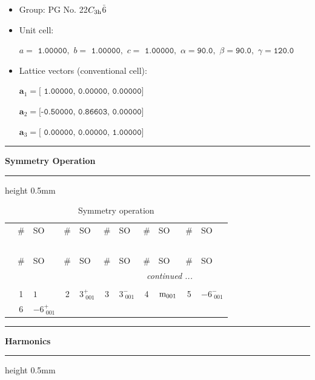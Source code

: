 \documentclass[fleqn,10pt,landscape]{jsarticle}
\begin{document}
\begin{itemize}
\item Group: PG No. 22\quad$C_{\rm 3h}$\quad$\bar{6}$\quad[ hexagonal ]
\end{itemize}
\begin{itemize}
\item Unit cell:

\quad $a=\texttt{ 1.00000},\,\, b=\texttt{ 1.00000},\,\, c=\texttt{ 1.00000},\,\, \alpha=\texttt{90.0},\,\, \beta=\texttt{90.0},\,\, \gamma=\texttt{120.0}$

\item Lattice vectors (conventional cell):

\quad $\bm{a}_1=\texttt{[ 1.00000, 0.00000, 0.00000]}$

\quad $\bm{a}_2=\texttt{[-0.50000, 0.86603, 0.00000]}$

\quad $\bm{a}_3=\texttt{[ 0.00000, 0.00000, 1.00000]}$

\end{itemize}
\vspace{5mm}
\noindent \rule[0.5mm]{5mm}{0.5mm}\hspace{3mm}\textbf{Symmetry Operation}\hspace{3mm}\leaders\hrule height 0.5mm\hfill\kern0pt
\vspace{3mm}

\renewcommand{\arraystretch}{1.6}
\begin{longtable}[l]{c|cl|cl|cl|cl|cl}
\captionsetup{justification=raggedright, singlelinecheck=off}
\caption{Symmetry operation}
 \\
 \hline \hline
 & \# & SO & \# & SO & \# & SO & \# & SO & \# & SO \\ \hline \endfirsthead

\multicolumn{10}{l}{\tablename\ \thetable{}} \\
 \hline \hline
 & \# & SO & \# & SO & \# & SO & \# & SO & \# & SO \\ \hline \endhead

 \hline \hline
\multicolumn{10}{r}{\footnotesize\it continued ...} \\ \endfoot

 \hline \hline
\multicolumn{10}{r}{} \\ \endlastfoot

 & 1 & $1$ & 2 & $3^{+}_{\,\,001}$ & 3 & $3^{-}_{\,\,001}$ & 4 & ${\rm m}_{001}$ & 5 & $-6^{-}_{\,\,001}$ \\
& 6 & $-6^{+}_{\,\,001}$ &  &  &  &  &  &  &  &  \\
\end{longtable}
\vspace{5mm}
\noindent \rule[0.5mm]{5mm}{0.5mm}\hspace{3mm}\textbf{Harmonics}\hspace{3mm}\leaders\hrule height 0.5mm\hfill\kern0pt
\vspace{3mm}
\end{document}
